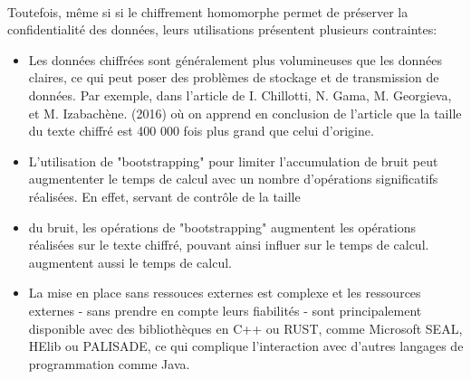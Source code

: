 \documentclass{article}
\begin{document}
$ $\\
Toutefois, même si si le chiffrement homomorphe permet de préserver la confidentialité des données, leurs utilisations présentent plusieurs contraintes:
\begin{itemize}
    \item Les données chiffrées sont généralement plus volumineuses que les données claires, ce qui peut poser des problèmes de stockage et de transmission de données. Par exemple,
          dans l'article de I. Chillotti, N. Gama, M. Georgieva, et M. Izabachène. (2016) \cite{end_size} où on apprend en conclusion de l'article que la taille du texte chiffré est 400 000 fois plus grand que celui d'origine.
    \item L'utilisation de "bootstrapping" \cite{boots} pour limiter l'accumulation de bruit peut augmententer le temps de calcul avec un nombre d'opérations significatifs réalisées. En effet, servant de contrôle de la taille
    \item du bruit, les opérations de "bootstrapping" augmentent les opérations réalisées sur le texte chiffré, pouvant ainsi influer sur le temps de calcul.
          augmentent aussi le temps de calcul.
    \item La mise en place sans ressouces externes est complexe et les ressources externes - sans prendre en compte leurs fiabilités - sont principalement disponible avec des bibliothèques
          en C++ ou RUST, comme Microsoft SEAL, HElib ou PALISADE, ce qui complique l'interaction avec d'autres langages de programmation comme Java.
\end{itemize}
\end{document}
